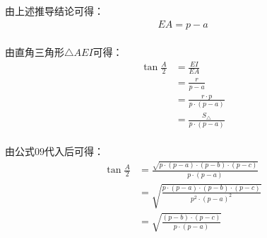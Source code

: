 \documentclass[UTF8]{ctexart}
\begin{document}
    由上述推导结论可得：
    \begin{align}
        EA=p-a
    \end{align}\\
    由直角三角形$\triangle AEI$可得：
    \begin{align}
        \tan{\frac{A}{2}}
        &=\frac{EI}{EA}\\[3mm]
        &=\frac{r}{p-a}\\[3mm]
        &=\frac{r\cdot p}{p\cdot(p-a)}\\[3mm]
        &=\frac{S_{\triangle}}{p\cdot(p-a)}
    \end{align}\\
    由公式$09$代入后可得：
    \begin{align}
        \tan{\frac{A}{2}}
        &=\frac{\sqrt{p\cdot(p-a)\cdot(p-b)\cdot(p-c)}}{p\cdot(p-a)}\\[3mm]
        &=\sqrt{\frac{p\cdot(p-a)\cdot(p-b)\cdot(p-c)}{p^2\cdot(p-a)^2}}\\[3mm]
        &=\sqrt{\frac{(p-b)\cdot(p-c)}{p\cdot(p-a)}}
    \end{align}

\newpage
\end{document}
